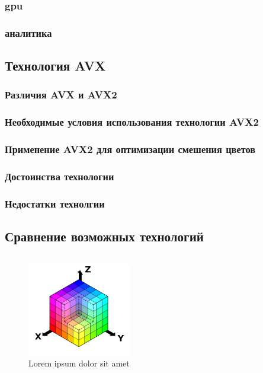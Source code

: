 \subsubsection{gpu}
\subsubsection{аналитика}
\subsection{Технология AVX}
\subsubsection{Различия AVX и AVX2}
\subsubsection{Необходимые условия использования технологии AVX2}
\subsubsection{Применение AVX2 для оптимизации смешения цветов}
\subsubsection{Достоинства технологии}
\subsubsection{Недостатки технолгии}
\subsection{Сравнение возможных технологий}
\subsection{}



\begin{figure}[ht!]
	\includegraphics[width=0.4\textwidth]{img/img1.png}
	\caption{Lorem ipsum dolor sit amet}
	\label{fig:spire05}
\end{figure}


